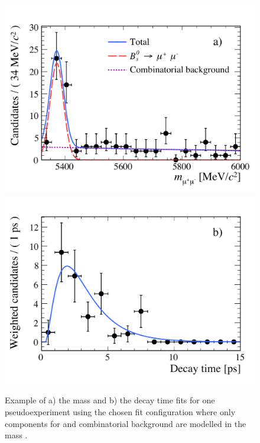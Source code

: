 
\pagebreak



\begin{figure}[tbp]
    \centering
        \includegraphics[width= 0.49 \textwidth]{./Figs/LifetimeMeasurement/5320-6000_toy_mass.pdf}
       \includegraphics[width=0.49 \textwidth]{./Figs/LifetimeMeasurement/5320-6000_toy_lifetime.pdf}
    \caption{Example of a) the mass and b) the decay time \ml fits for one pseudoexperiment using the chosen fit configuration where only components for \bsmumu and combinatorial background are modelled in the mass \pdf.}
    \label{fig:toyegs}
\end{figure}

